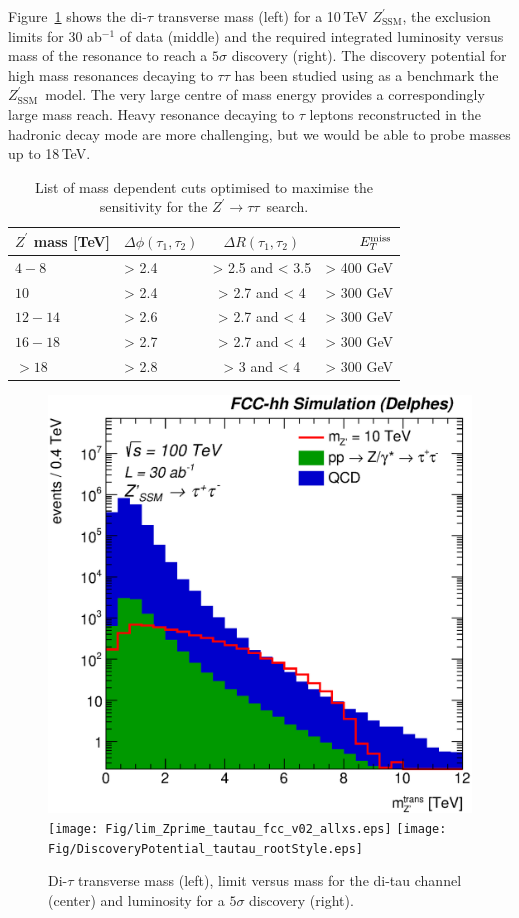 \documentclass[a4paper,11pt]{article}
\newcommand{\Zp}{\ensuremath{Z^{\prime}}}
\newcommand{\ZpSSM}{\ensuremath{Z^{\prime}_{\mathrm{SSM}}}}
\newcommand*{\Zptata}{\ensuremath{Z^{\prime}\rightarrow \tau\tau}}
\newcommand*{\met}{\ensuremath{E_{T}^{\rm{miss}}}}
\begin{document}
Figure~\ref{figure:leptonicresonances:tautau} shows the di-$\tau$ transverse mass (left) for a 10\,TeV \ZpSSM, the exclusion limits for 30 ab$^{-1}$ of data (middle) and the required integrated luminosity versus mass of the resonance to reach a $5\sigma$ discovery (right).
The discovery potential for high mass resonances decaying to $\tau\tau$ has been studied using as a benchmark the \ZpSSM\ model. The very large centre of mass energy provides a correspondingly large mass reach. Heavy resonance decaying to $\tau$ leptons reconstructed in the hadronic decay mode are more challenging, but we would be able to probe masses up to 18\,TeV.

\begin{table}[htbp]
   \centering
\begin{tabular}{|l|l|c|r|}
  \hline
  \hline
   $\Zp$ mass [TeV] &  $\Delta \phi(\tau_1, \tau_2)$&  $\Delta R(\tau_1, \tau_2)$ & $\met$\\
  \hline
  $4-8$ & > 2.4 & > 2.5 and < 3.5 & > 400 GeV\\
  $10$ & > 2.4 & > 2.7 and < 4 & > 300 GeV\\
  $12-14$ & > 2.6 & > 2.7 and < 4 & > 300 GeV\\
  $16-18$ & > 2.7 & > 2.7 and < 4 & > 300 GeV\\
  $>18$ & > 2.8 & > 3 and < 4 & > 300 GeV\\
  \hline
  \hline
  \end{tabular}
  \caption{List of mass dependent cuts optimised to maximise the sensitivity for the \Zptata\ search.}
  \label{tab:leptonicresonances:tautau}
\end{table}


\begin{figure}[!htb]
  \centering
  \includegraphics[width=0.32\columnwidth]{Fig/mt_finalsel_nostack_log.eps}
  \texttt{[image: Fig/lim\_Zprime\_tautau\_fcc\_v02\_allxs.eps]}
  \texttt{[image: Fig/DiscoveryPotential\_tautau\_rootStyle.eps]}
  \caption{Di-$\tau$ transverse mass (left), limit versus mass for the di-tau channel (center) and luminosity for a $5\sigma$ discovery (right). }
  \label{figure:leptonicresonances:tautau}
\end{figure}
\end{document}

